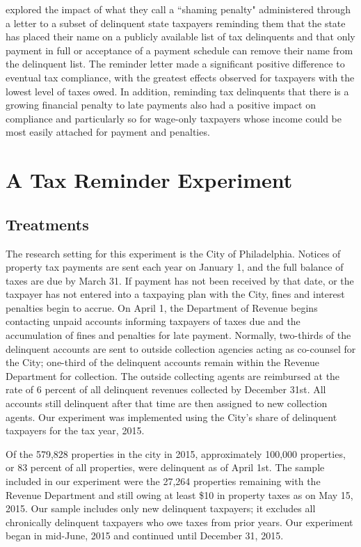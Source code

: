 \documentclass[12pt]{article}
\begin{document}
 explored the impact of what they call
a ``shaming penalty" administered through a letter to a subset of
delinquent state taxpayers reminding them that the state has placed
their name on a publicly available list of tax delinquents and that
only payment in full or acceptance of a payment schedule can remove
their name from the delinquent list.  The reminder letter made a
significant positive difference to eventual tax compliance, with the
greatest effects observed for taxpayers with the lowest level of taxes
owed.  In addition, reminding tax delinquents that there is a growing
financial penalty to late payments also had a positive impact on
compliance and particularly so for wage-only taxpayers whose income
could be most easily attached for payment and penalties.

  
\section{ A Tax Reminder Experiment}
  
\subsection{Treatments}

The research setting for this experiment is the City of Philadelphia.
Notices of property tax payments are sent each year on January 1, and
the full balance of taxes are due by March 31.  If payment has not
been received by that date, or the taxpayer has not entered into a
taxpaying plan with the City, fines and interest penalties begin to
accrue.  On April 1, the Department of Revenue begins contacting
unpaid accounts informing taxpayers of taxes due and the accumulation
of fines and penalties for late payment.  Normally, two-thirds of the
delinquent accounts are sent to outside collection agencies acting as
co-counsel for the City; one-third of the delinquent accounts remain
within the Revenue Department for collection.  The outside collecting
agents are reimbursed at the rate of 6 percent of all delinquent
revenues collected by December 31st.  All accounts still delinquent
after that time are then assigned to new collection agents.  Our
experiment was implemented using the City's share of delinquent
taxpayers for the tax year, 2015.
  
Of the 579,828 properties in the city in 2015, approximately 100,000
properties, or 83 percent of all properties, were delinquent as of
April 1st.  The sample included in our experiment were the 27,264
properties remaining with the Revenue Department and still owing at
least \$10 in property taxes as on May 15, 2015.  Our sample includes
only new delinquent taxpayers; it excludes all chronically delinquent
taxpayers who owe taxes from prior years.  Our experiment began in
mid-June, 2015 and continued until December 31, 2015. 
  
\end{document}
